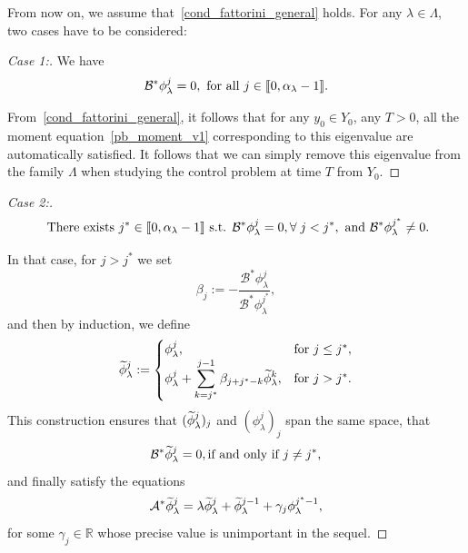 \documentclass[10pt]{amsart}
\theoremstyle{definition}\newtheorem{defi}[theo]{Definition}\newtheorem{rema}[theo]{Remark}\newtheorem{exam}[theo]{Example}\newtheorem{exem}[theo]{Example}\newtheorem{nota}[theo]{Notation}
\newenvironment{step}[1]{\begin{proof}[#1]}{\let\qed\relax\end{proof}}
\newcommand{\llbracket}{\mathopen{[\mkern -2.7mu[}}
\newcommand{\rrbracket}{\mathclose{]\mkern -2.7mu]}}
\newcommand{\inter}[2]{\llbracket #1,#2 \rrbracket}
\newcommand\As{\mathcal{A}^*}
\newcommand\Bs{\mathcal{B}^*}
\newcommand{\Fzp}{Y_0}
\newcommand{\R}{\mathbb{R}}
\let\oldtilde\tilde
\renewcommand*{\tilde}[1]{\mathchoice{\widetilde{#1}}{\widetilde{#1}}{\oldtilde{#1}}{\oldtilde{#1}}}\let\oldexists\exists
\renewcommand*{\exists}{\mathrel{\oldexists}}
\let\oldforall\forall
\renewcommand*{\forall}{\mathrel{\oldforall}}
\begin{document}
From now on, we assume that~\eqref{cond_fattorini_general} holds. For any $\lambda\in \Lambda$, two cases have to be considered:
\begin{step}{Case 1:}
We have
\begin{equation*}\label{AC_case1}
\Bs \phi_\lambda^j=0, \ \text{for all }j\in \inter{0}{\alpha_\lambda-1}.
\end{equation*}

From~\eqref{cond_fattorini_general}, it follows that for any $y_0\in \Fzp$, any $T>0$, all the moment equation~\eqref{pb_moment_v1} corresponding to this eigenvalue are automatically satisfied. It follows that we can simply remove this eigenvalue from the family $\Lambda$ when studying the control problem at time $T$ from $\Fzp$.
\end{step}
\begin{step}{Case 2:}
\begin{equation}\label{AC_case2}
\text{ There exists } j^*\in \inter{0}{\alpha_\lambda-1} \text{ s.t. } \Bs \phi_\lambda^j=0, \forall j< j^*, \ \text{and} \ \Bs \phi_\lambda^{j^*}\neq 0.
\end{equation}

In that case, for $j>j^*$ we set
\[
\beta_j:=-\frac{\Bs \phi_\lambda^j}{\Bs \phi_\lambda^{j^*}},
\]
and then by induction, we define
\begin{equation}\label{def_phi_tilde}
\tilde{\phi}_\lambda^j :=
\begin{cases} \phi_\lambda^j,& \text{for }j\leq j^*,\\
\displaystyle \phi_\lambda^j + \sum_{k=j^*}^{j-1} \beta_{j+j^*-k} \tilde{\phi}_\lambda^k,& \text{for }j>j^*.
\end{cases}
\end{equation}
This construction ensures that $(\tilde{\phi}_\lambda^j)_j$ and $(\phi_\lambda^j)_j$ span the same space, that
\begin{equation}\label{observabilite_generale}
\Bs \tilde{\phi}_\lambda^j=0, \text{if and only if $j\neq j^*$,}
\end{equation}
and finally satisfy the equations
\[
\As \tilde{\phi}_\lambda^j = \lambda \tilde{\phi}_\lambda^j + \tilde{\phi}_\lambda^{j-1} + \gamma_j \phi_\lambda ^{j^*-1},
\]
for some $\gamma_j\in \R$ whose precise value is unimportant in the sequel.


\end{step}
\end{document}
